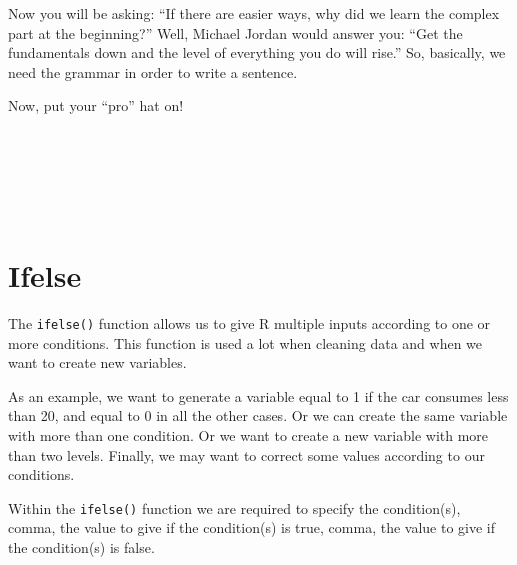 \documentclass[
]{svmono}
\begin{document}
Now you will be asking: ``If there are easier ways, why did we learn the
complex part at the beginning?'' Well, Michael Jordan would answer you:
``Get the fundamentals down and the level of everything you do will
rise.'' So, basically, we need the grammar in order to write a sentence.

Now, put your ``pro'' hat on!

~

~

~

\hypertarget{ifelse}{%
\section{Ifelse}\label{ifelse}}

The \texttt{ifelse()} function allows us to give R multiple inputs according to
one or more conditions. This function is used a lot when cleaning data
and when we want to create new variables.

As an example, we want to generate a variable equal to 1 if the car
consumes less than 20, and equal to 0 in all the other cases. Or we can
create the same variable with more than one condition. Or we want to
create a new variable with more than two levels. Finally, we may want to
correct some values according to our conditions.

Within the \texttt{ifelse()} function we are required to specify the
condition(s), comma, the value to give if the condition(s) is true,
comma, the value to give if the condition(s) is false.
\end{document}
